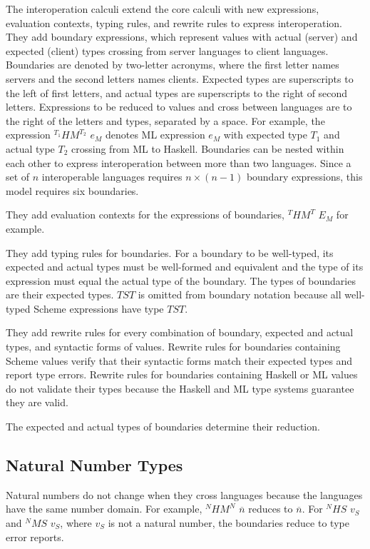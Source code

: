 The interoperation calculi extend the core calculi with new expressions, evaluation contexts, typing rules, and rewrite rules to express interoperation.  They add boundary expressions, which represent values with actual (server) and expected (client) types crossing from server languages to client languages.  Boundaries are denoted by two-letter acronyms, where the first letter names servers and the second letters names clients.  Expected types are superscripts to the left of first letters, and actual types are superscripts to the right of second letters.  Expressions to be reduced to values and cross between languages are to the right of the letters and types, separated by a space.  For example, the expression $^{T_{1}}HM^{T_{2}}$ $e_{M}$ denotes ML expression $e_{M}$ with expected type $T_{1}$ and actual type $T_{2}$ crossing from ML to Haskell.  Boundaries can be nested within each other to express interoperation between more than two languages.  Since a set of $n$ interoperable languages requires $n\times(n-1)$ boundary expressions, this model requires six boundaries.

They add evaluation contexts for the expressions of boundaries, $^{T}HM^{T}$ $E_{M}$ for example.

They add typing rules for boundaries.  For a boundary to be well-typed, its expected and actual types must be well-formed and equivalent and the type of its expression must equal the actual type of the boundary.  The types of boundaries are their expected types.  $TST$ is omitted from boundary notation because all well-typed Scheme expressions have type $TST$.

They add rewrite rules for every combination of boundary, expected and actual types, and syntactic forms of values.  Rewrite rules for boundaries containing Scheme values verify that their syntactic forms match their expected types and report type errors.  Rewrite rules for boundaries containing Haskell or ML values do not validate their types because the Haskell and ML type systems guarantee they are valid.

The expected and actual types of boundaries determine their reduction.

\subsection{Natural Number Types}

Natural numbers do not change when they cross languages because the languages have the same number domain.  For example, $^{N}HM^{N}$ $\overline{n}$ reduces to $\overline{n}$.  For $^{N}HS$ $v_{S}$ and $^{N}MS$ $v_{S}$, where $v_{S}$ is not a natural number, the boundaries reduce to type error reports.

